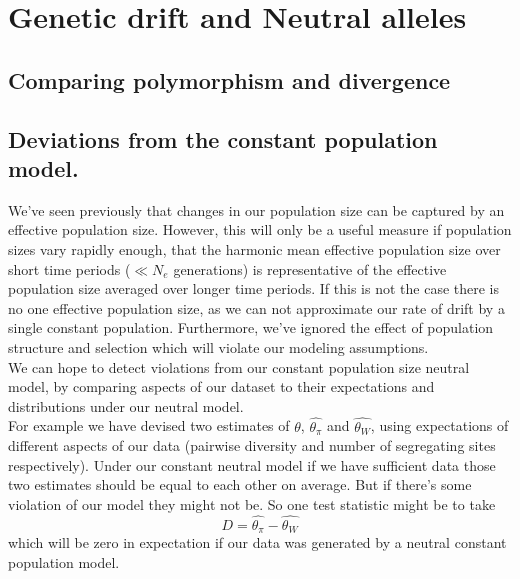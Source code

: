 \section{Genetic drift and Neutral alleles}






\subsection{Comparing polymorphism and divergence}


\subsection{Deviations from the constant population model.}
We've seen previously that changes in our population size can be
captured by an effective population size. However, this will only be a
useful measure if population sizes vary rapidly enough, that the
harmonic mean effective population size over short time periods ($\ll
N_e$ generations) is representative of the effective population size averaged over
longer time periods. If this is not the case there is no one effective
population size, as we can not approximate our rate of drift by a
single constant population. Furthermore, we've ignored the effect of
population structure and selection which will violate our modeling
assumptions. \\

We can hope to detect violations from our constant population size
neutral model, by comparing aspects of our dataset to their expectations
and distributions under our neutral model. \\

For example we have devised two estimates of $\theta$,
$\widehat{\theta_{\pi}}$ and $\widehat{\theta_{W}}$, using
expectations of different aspects of our data (pairwise diversity and
number of segregating sites respectively). Under our constant neutral
model if we have sufficient data those two estimates should be
equal to each other on average. But if there's some violation of our model they might not
be. So one test statistic might be to take
\begin{equation}
D = \widehat{\theta_{\pi}} - \widehat{\theta_{W}}
\end{equation}
which will be zero in expectation if our data was generated by a
neutral constant population model.




\newpage
